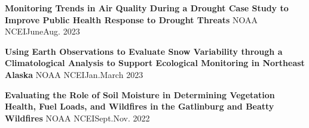 {\entrybigwrap
    {{\textbf{Monitoring Trends in Air Quality During a Drought Case Study to Improve Public Health Response to Drought Threats}}}
    {{NOAA NCEI}{\hfill June\textendash Aug. 2023}}

\entrybigwrap
    {{\textbf{Using Earth Observations to Evaluate Snow Variability through a Climatological Analysis to Support Ecological Monitoring in Northeast Alaska}}}
    {{NOAA NCEI}{\hfill Jan.\textendash March 2023}}

\entrybigwrap
    {{\textbf{Evaluating the Role of Soil Moisture in Determining Vegetation Health, Fuel Loads, and Wildfires in the Gatlinburg and Beatty Wildfires}}}
    {{NOAA NCEI}{\hfill Sept.\textendash Nov. 2022}}

}
